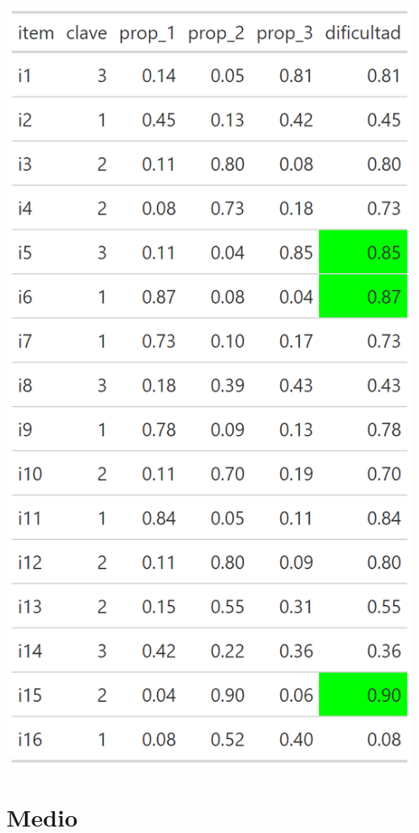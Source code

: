 \documentclass[
  letterpaper,
  DIV=11,
  numbers=noendperiod]{scrreprt}
\begin{document}
\begin{center}
\includegraphics[width=0.6\linewidth,height=\textheight,keepaspectratio]{images/teoria_clasica_diff_facil.png}
\end{center}

\section{Medio}
\end{document}
